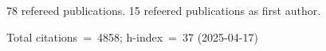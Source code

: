 78 refereed publications. 15 refeered publications as first author.

Total citations~=~4858; h-index~=~37 (2025-04-17)